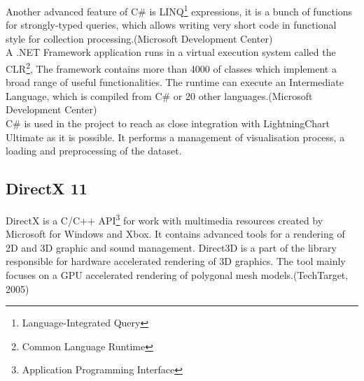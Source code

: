 \documentclass[twoside, english, 11pt]{report}
\begin{document}
Another advanced feature of C\# is  LINQ\footnote{Language-Integrated Query} expressions, it is a bunch of functions for strongly-typed queries, which allows writing very short code in functional style for collection processing.(Microsoft Development Center)\\

A .NET Framework application runs in a virtual execution system called the CLR\footnote{Common Language Runtime}, The framework contains more than 4000 of classes which implement a broad range of useful functionalities. The runtime can execute an Intermediate Language, which is compiled from C\# or 20 other languages.(Microsoft Development Center)\\

C\# is used in the project to reach as close integration with LightningChart Ultimate as it is possible. It performs a management of visualisation process, a loading and preprocessing of the dataset.

\subsection{DirectX 11}
DirectX is a C/C++ API\footnote{Application Programming Interface} for work with multimedia resources created by Microsoft for Windows and Xbox. It contains advanced tools for a rendering of 2D and 3D graphic and sound management. Direct3D is a part of the library responsible for hardware accelerated rendering of 3D graphics. The tool mainly focuses on a GPU accelerated rendering of polygonal mesh models.(TechTarget, 2005)\\
\end{document}
